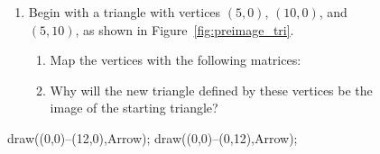 \documentclass[../textbook.tex]{subfiles}
\begin{document}
\newcommand{\mtrxtbt}[4] {$\left[\begin{array}{cc}#1 & #2 \\ #3 & #4 \end{array}\right]$}

\begin{figure}[h]
	\begin{center}
		\begin{minipage}[c]{0.55\textwidth}
			\begin{enumerate}
				\setcounter{enumi}{\value{problem_i}}
				\item Begin with a triangle with vertices $(5,0)$, $(10,0)$, and $(5,10)$, as shown in Figure~\ref{fig:preimage_tri}. %
				\begin{enumerate}
					\item Map the vertices with the following matrices:
					\begin{enumerate}
						\begin{multicols}{2}\raggedcolumns
							\item $\left[\begin{array}{cc}1 & 0 \\ 0 & 1 \end{array}\right]$
							\item $\left[\begin{array}{cc}.6 & -.8 \\ .8 & .6 \end{array}\right]$
							\item $\left[\begin{array}{cc}.6 & .8 \\ .8 & -.6 \end{array}\right]$
						\end{multicols}
					\end{enumerate}
					\item Why will the new triangle defined by these vertices be the image of the starting triangle?

					\setcounter{another_name}{\value{enumii}}
				\end{enumerate}
				\setcounter{problem_i}{\value{enumi}}
			\end{enumerate}
		\end{minipage}
		\hfill
		\begin{minipage}[c]{0.35\textwidth}
			\begin{center}
				\begin{minipage}[b]{\textwidth}
					\centering
					\begin{asy}[width=0.7\textwidth]
						draw((0,0)--(12,0),Arrow);
						draw((0,0)--(0,12),Arrow);


\end{asy}
\end{minipage}
\end{center}
\end{minipage}
\end{center}
\end{figure}
\end{document}

